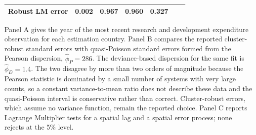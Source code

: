 \begin{table}[!t]
\begin{tabular*}{\textwidth}{@{\extracolsep\fill}l r r r r r r@{}}
Robust LM error & 0.002 & 0.967 & 0.960 & 0.327 & \\
\bottomrule
\end{tabular*}
\begin{tablenotes}
\item[] Panel A gives the year of the most recent research and development expenditure observation for each estimation country. Panel B compares the reported cluster-robust standard errors with quasi-Poisson standard errors formed from the Pearson dispersion, $\hat\phi_{P} = 286$. The deviance-based dispersion for the same fit is $\hat\phi_{D} = 1.4$. The two disagree by more than two orders of magnitude because the Pearson statistic is dominated by a small number of systems with very large counts, so a constant variance-to-mean ratio does not describe these data and the quasi-Poisson interval is conservative rather than correct. Cluster-robust errors, which assume no variance function, remain the reported choice. Panel C reports Lagrange Multiplier tests for a spatial lag and a spatial error process; none rejects at the 5\% level.
\end{tablenotes}
\end{table}
